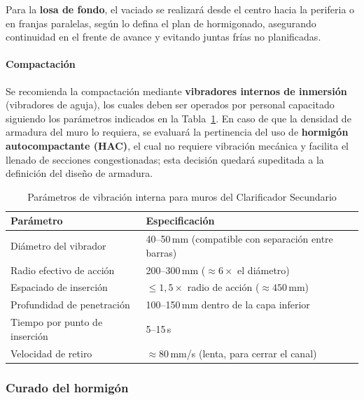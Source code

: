 Para la \textbf{losa de fondo}, el vaciado se realizará desde el centro hacia la periferia o en franjas paralelas, según lo defina el plan de hormigonado, asegurando continuidad en el frente de avance y evitando juntas frías no planificadas.

\paragraph{Compactación}

Se recomienda la compactación mediante \textbf{vibradores internos de inmersión} (vibradores de aguja), los cuales deben ser operados por personal capacitado siguiendo los parámetros indicados en la Tabla~\ref{tab:vibracion}. En caso de que la densidad de armadura del muro lo requiera, se evaluará la pertinencia del uso de \textbf{hormigón autocompactante (HAC)}, el cual no requiere vibración mecánica y facilita el llenado de secciones congestionadas; esta decisión quedará supeditada a la definición del diseño de armadura.

\begin{table}[H]
  \centering
  \caption{Parámetros de vibración interna para muros del Clarificador Secundario}
  \label{tab:vibracion}
  \begin{tabular}{p{6cm} p{8.5cm}}
    \toprule
    \textbf{Parámetro}              & \textbf{Especificación} \\
    \midrule
    Diámetro del vibrador           & 40--50\,mm (compatible con separación entre barras) \\
    Radio efectivo de acción        & 200--300\,mm ($\approx 6 \times$ el diámetro) \\
    Espaciado de inserción          & $\leq 1{,}5 \times$ radio de acción ($\approx 450$\,mm) \\
    Profundidad de penetración      & 100--150\,mm dentro de la capa inferior \\
    Tiempo por punto de inserción   & 5--15\,s \\
    Velocidad de retiro             & $\approx 80$\,mm/s (lenta, para cerrar el canal) \\
    \bottomrule
  \end{tabular}
\end{table}

\subsubsection{Curado del hormigón}

